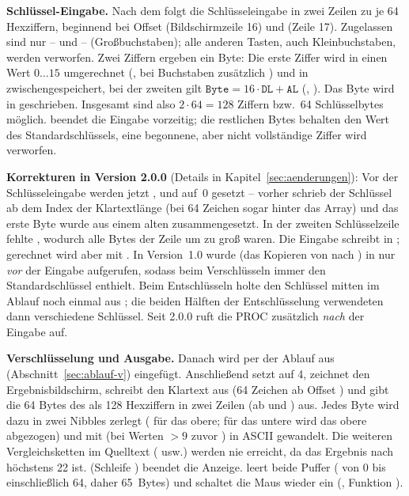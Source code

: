 \textbf{Schlüssel-Eingabe.} Nach dem  folgt die Schlüsseleingabe in zwei Zeilen zu je 64 Hexziffern, beginnend bei Offset  (Bildschirmzeile 16) und  (Zeile 17). Zugelassen sind nur -- und -- (Großbuchstaben); alle anderen Tasten, auch Kleinbuchstaben, werden verworfen. Zwei Ziffern ergeben ein Byte: Die erste Ziffer wird in einen Wert $0\ldots15$ umgerechnet (, bei Buchstaben zusätzlich ) und in  zwischengespeichert, bei der zweiten gilt $\mathtt{Byte}=16\cdot\mathtt{DL}+\mathtt{AL}$ (, ). Das Byte wird in  geschrieben. Insgesamt sind also $2\cdot64=128$ Ziffern bzw.\ 64 Schlüsselbytes möglich.  beendet die Eingabe vorzeitig; die restlichen Bytes behalten den Wert des Standardschlüssels, eine begonnene, aber nicht vollständige Ziffer wird verworfen.

\textbf{Korrekturen in Version 2.0.0} (Details in Kapitel~\ref{sec:aenderungen}): Vor der Schlüsseleingabe werden jetzt ,  und  auf~0 gesetzt -- vorher schrieb der Schlüssel ab dem Index der Klartextlänge (bei 64 Zeichen sogar hinter das Array) und das erste Byte wurde aus einem alten  zusammengesetzt. In der zweiten Schlüsselzeile fehlte , wodurch alle Bytes der Zeile um  zu groß waren. Die Eingabe schreibt in ; gerechnet wird aber mit . In Version~1.0 wurde  (das Kopieren von  nach ) in  nur \emph{vor} der Eingabe aufgerufen, sodass  beim Verschlüsseln immer den Standardschlüssel enthielt. Beim Entschlüsseln holte  den Schlüssel mitten im Ablauf noch einmal aus ; die beiden Hälften der Entschlüsselung verwendeten dann verschiedene Schlüssel. Seit 2.0.0 ruft  die PROC zusätzlich \emph{nach} der Eingabe auf.

\textbf{Verschlüsselung und Ausgabe.} Danach wird per  der Ablauf aus  (Abschnitt~\ref{sec:ablauf-v}) eingefügt. Anschließend setzt   auf 4, zeichnet den Ergebnisbildschirm, schreibt den Klartext aus  (64 Zeichen ab Offset ) und gibt die 64 Bytes des  als 128 Hexziffern in zwei Zeilen (ab  und ) aus. Jedes Byte wird dazu in zwei Nibbles zerlegt ( für das obere; für das untere wird das obere abgezogen) und mit  (bei Werten $>9$ zuvor ) in ASCII gewandelt. Die weiteren Vergleichsketten im Quelltext ( usw.) werden nie erreicht, da das Ergebnis nach  höchstens 22 ist.  (Schleife ) beendet die Anzeige.  leert beide Puffer ( von 0 bis einschließlich 64, daher 65~Bytes) und schaltet die Maus wieder ein (, Funktion ).

